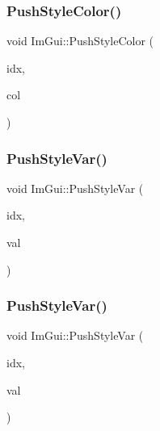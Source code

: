 \subsubsection{\texorpdfstring{Push\+Style\+Color()}{PushStyleColor()}\hspace{0.1cm}{\footnotesize\ttfamily [2/2]}}
{\footnotesize\ttfamily void Im\+Gui\+::\+Push\+Style\+Color (\begin{DoxyParamCaption}\item[{\mbox{\hyperlink{imgui_8h_a1b0467ec582e731ae6292fef726fb5fe}{Im\+Gui\+Col}}}]{idx,  }\item[{const \mbox{\hyperlink{struct_im_vec4}{Im\+Vec4}} \&}]{col }\end{DoxyParamCaption})}

\mbox{\label{namespace_im_gui_aab3f43009094462cf2a5eb554785949b}} 
\subsubsection{\texorpdfstring{Push\+Style\+Var()}{PushStyleVar()}\hspace{0.1cm}{\footnotesize\ttfamily [1/2]}}
{\footnotesize\ttfamily void Im\+Gui\+::\+Push\+Style\+Var (\begin{DoxyParamCaption}\item[{\mbox{\hyperlink{imgui_8h_ac919acabce24faae590e295b424874ca}{Im\+Gui\+Style\+Var}}}]{idx,  }\item[{float}]{val }\end{DoxyParamCaption})}

\mbox{\label{namespace_im_gui_ae404b6978e9aedec5c16627d8c45f923}} 
\subsubsection{\texorpdfstring{Push\+Style\+Var()}{PushStyleVar()}\hspace{0.1cm}{\footnotesize\ttfamily [2/2]}}
{\footnotesize\ttfamily void Im\+Gui\+::\+Push\+Style\+Var (\begin{DoxyParamCaption}\item[{\mbox{\hyperlink{imgui_8h_ac919acabce24faae590e295b424874ca}{Im\+Gui\+Style\+Var}}}]{idx,  }\item[{const \mbox{\hyperlink{struct_im_vec2}{Im\+Vec2}} \&}]{val }\end{DoxyParamCaption})}

